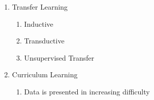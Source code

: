 \begin{enumerate}
    \item Transfer Learning
    \begin{enumerate}
      \item Inductive
      \item Transductive
      \item Unsupervised Transfer
    \end{enumerate}

    \item Curriculum Learning
    \begin{enumerate}
      \item Data is presented in increasing difficulty
    \end{enumerate}
\end{enumerate}



